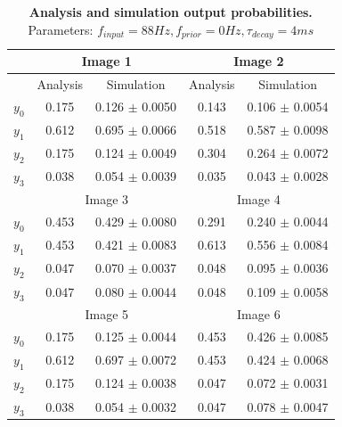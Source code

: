 \begin{table}[]
\label{tab:1D_88_0_4}
\small
\tabcolsep=0.11cm
\begin{tabular}{|c|cc|cc|}
\hline
                       & \multicolumn{2}{c|}{Image 1}                       & \multicolumn{2}{c|}{Image 2}                       \\ \hline
                       & \multicolumn{1}{c|}{Analysis} & Simulation         & \multicolumn{1}{c|}{Analysis} & Simulation         \\ \hline
$y_0$                  & \multicolumn{1}{c|}{0.175}    & 0.126 $\pm$ 0.0050 & \multicolumn{1}{c|}{0.143}    & 0.106 $\pm$ 0.0054 \\ \hline
$y_1$                  & \multicolumn{1}{c|}{0.612}    & 0.695 $\pm$ 0.0066 & \multicolumn{1}{c|}{0.518}    & 0.587 $\pm$ 0.0098 \\ \hline
$y_2$                  & \multicolumn{1}{c|}{0.175}    & 0.124 $\pm$ 0.0049 & \multicolumn{1}{c|}{0.304}    & 0.264 $\pm$ 0.0072 \\ \hline
$y_3$                  & \multicolumn{1}{c|}{0.038}    & 0.054 $\pm$ 0.0039 & \multicolumn{1}{c|}{0.035}    & 0.043 $\pm$ 0.0028 \\ \hline
                       & \multicolumn{2}{c|}{Image 3}                       & \multicolumn{2}{c|}{Image 4}                       \\ \hline
$y_0$                  & \multicolumn{1}{c|}{0.453}    & 0.429 $\pm$ 0.0080 & \multicolumn{1}{c|}{0.291}    & 0.240 $\pm$ 0.0044 \\ \hline
$y_1$                  & \multicolumn{1}{c|}{0.453}    & 0.421 $\pm$ 0.0083 & \multicolumn{1}{c|}{0.613}    & 0.556 $\pm$ 0.0084 \\ \hline
$y_2$                  & \multicolumn{1}{c|}{0.047}    & 0.070 $\pm$ 0.0037 & \multicolumn{1}{c|}{0.048}    & 0.095 $\pm$ 0.0036 \\ \hline
$y_3$                  & \multicolumn{1}{c|}{0.047}    & 0.080 $\pm$ 0.0044 & \multicolumn{1}{c|}{0.048}    & 0.109 $\pm$ 0.0058 \\ \hline
						& \multicolumn{2}{c|}{Image 5}                       & \multicolumn{2}{c|}{Image 6}                       \\ \hline
$y_0$                  & \multicolumn{1}{c|}{0.175}    & 0.125 $\pm$ 0.0044 & \multicolumn{1}{c|}{0.453}    & 0.426 $\pm$ 0.0085 \\ \hline
$y_1$                  & \multicolumn{1}{c|}{0.612}    & 0.697 $\pm$ 0.0072 & \multicolumn{1}{c|}{0.453}    & 0.424 $\pm$ 0.0068 \\ \hline
$y_2$                  & \multicolumn{1}{c|}{0.175}    & 0.124 $\pm$ 0.0038 & \multicolumn{1}{c|}{0.047}    & 0.072 $\pm$ 0.0031 \\ \hline
$y_3$                  & \multicolumn{1}{c|}{0.038}    & 0.054 $\pm$ 0.0032 & \multicolumn{1}{c|}{0.047}    & 0.078 $\pm$ 0.0047 \\ \hline
\end{tabular}
\caption{\textbf{Analysis and simulation output probabilities. } Parameters: $f_{input} = 88 Hz, f_{prior} = 0 Hz, \tau_{decay} = 4 ms$}
\end{table}


